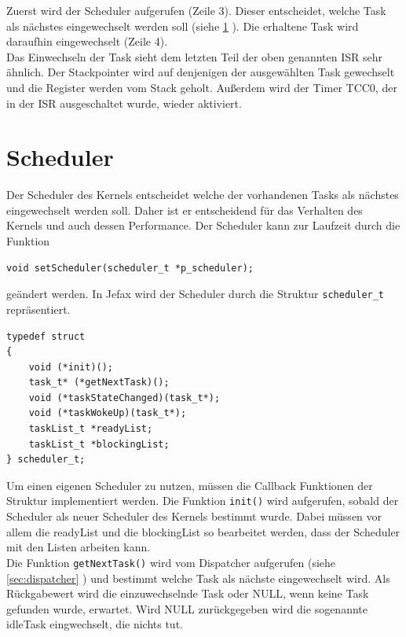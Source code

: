 \documentclass[fontsize=12pt, toc=bibliography, notitlepage]{scrreprt}
\newcommand{\refnn}[1]{\ref{#1} \nameref{#1}}
\begin{document}
Zuerst wird der Scheduler aufgerufen (Zeile 3). Dieser entscheidet, welche Task als nächstes eingewechselt werden soll (siehe \refnn{sec:scheduler}). Die erhaltene Task wird daraufhin eingewechselt (Zeile 4).\\

Das Einwechseln der Task sieht dem letzten Teil der oben genannten ISR sehr ähnlich. Der Stackpointer wird auf denjenigen der ausgewählten Task gewechselt und die Register werden vom Stack geholt. Außerdem wird der Timer TCC0, der in der ISR ausgeschaltet wurde, wieder aktiviert. 

\newpage

\section{Scheduler}
\label{sec:scheduler}
Der Scheduler des Kernels entscheidet welche der vorhandenen Tasks als nächstes eingewechselt werden soll. Daher ist er entscheidend für das Verhalten des Kernels und auch dessen Performance. Der Scheduler kann zur Laufzeit durch die Funktion

\begin{lstlisting}
void setScheduler(scheduler_t *p_scheduler);
\end{lstlisting}

geändert werden. In Jefax wird der Scheduler durch die Struktur \verb|scheduler_t| repräsentiert.

\begin{lstlisting}[title=scheduler.h]
typedef struct
{
	void (*init)();
	task_t* (*getNextTask)();
	void (*taskStateChanged)(task_t*);
	void (*taskWokeUp)(task_t*);
	taskList_t *readyList;
	taskList_t *blockingList;
} scheduler_t;
\end{lstlisting}

Um einen eigenen Scheduler zu nutzen, müssen die Callback Funktionen der Struktur implementiert werden. Die Funktion \lstinline$init()$ wird aufgerufen, sobald der Scheduler als neuer Scheduler des Kernels bestimmt wurde. Dabei müssen vor allem die readyList und die blockingList so bearbeitet werden, dass der Scheduler mit den Listen arbeiten kann.\\

Die Funktion \lstinline$getNextTask()$ wird vom Dispatcher aufgerufen (siehe \refnn{sec:dispatcher}) und bestimmt welche Task als nächste eingewechselt wird. Als Rückgabewert wird die einzuwechselnde Task oder NULL, wenn keine Task gefunden wurde, erwartet. Wird NULL zurückgegeben wird die sogenannte idleTask eingwechselt, die nichts tut.\\
\end{document}
